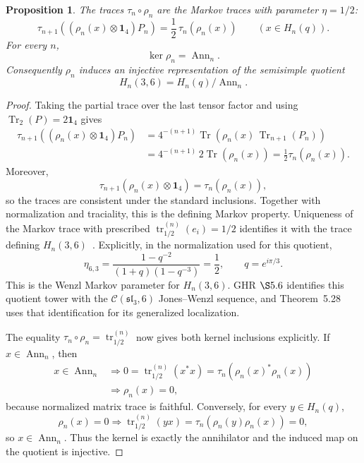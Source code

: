 \documentclass[11pt]{article}
\newtheorem{proposition}[theorem]{Proposition}
\theoremstyle{remark}
\newcommand{\Id}{\mathbf 1}
\newcommand{\Tr}{\operatorname{Tr}}
\newcommand{\cC}{\mathcal C}
\begin{document}
\begin{proposition}\label{prop:markov}
The traces \(\tau_n\circ\rho_n\) are the Markov traces with parameter
\(\eta=1/2\):
\begin{equation}
  \tau_{n+1}\!\left((\rho_n(x)\otimes\Id_4)P_n\right)
  =\frac12\,\tau_n(\rho_n(x))
  \qquad(x\in H_n(q)).
  \label{eq:markov}
\end{equation}
For every \(n\),
\[
  \ker\rho_n=\operatorname{Ann}_n.
\]
Consequently \(\rho_n\)
induces an injective representation of the semisimple quotient
\[
  H_n(3,6)=H_n(q)/\operatorname{Ann}_n.
\]
\end{proposition}

\begin{proof}
Taking the partial trace over the last tensor factor and using
\(\Tr_2(P)=2\Id_4\) gives
\[
\begin{aligned}
  \tau_{n+1}\!\left((\rho_n(x)\otimes\Id_4)P_n\right)
  &=
  4^{-(n+1)}
  \Tr\!\left(\rho_n(x)\,\Tr_{n+1}(P_n)\right)\\
  &=
  4^{-(n+1)}\,2\Tr(\rho_n(x))
   =\frac12\tau_n(\rho_n(x)).
\end{aligned}
\]
Moreover,
\[
  \tau_{n+1}(\rho_n(x)\otimes\Id_4)=\tau_n(\rho_n(x)),
\]
so the traces are consistent under the standard inclusions.
Together with normalization and traciality, this is the defining Markov
property.  Uniqueness of the Markov trace with prescribed
\(\operatorname{tr}^{(n)}_{1/2}(e_i)=1/2\) identifies it with the trace defining
\(H_n(3,6)\)~\cite[Eq.~(3.2)]{Wenzl1988}.  Explicitly, in the normalization
used for this quotient,
\[
  \eta_{6,3}
  =\frac{1-q^{-2}}{(1+q)(1-q^{-3})}
  =\frac12,
  \qquad q=e^{i\pi/3}.
\]
This is the Wenzl Markov parameter for \(H_n(3,6)\).  GHR \(\S5.6\) identifies
this quotient tower with the \(\cC(\mathfrak{sl}_3,6)\) Jones--Wenzl sequence,
and Theorem~5.28 uses that identification for its generalized localization.

The equality \(\tau_n\circ\rho_n=\operatorname{tr}^{(n)}_{1/2}\) now gives
both kernel inclusions explicitly.  If \(x\in\operatorname{Ann}_n\), then
\[
\begin{aligned}
  x\in\operatorname{Ann}_n
  &\Longrightarrow
  0=\operatorname{tr}^{(n)}_{1/2}(x^*x)
   =\tau_n\!\left(\rho_n(x)^*\rho_n(x)\right)\\
  &\Longrightarrow \rho_n(x)=0,
\end{aligned}
\]
because normalized matrix trace is faithful.  Conversely, for every
\(y\in H_n(q)\),
\[
  \rho_n(x)=0
  \Longrightarrow
  \operatorname{tr}^{(n)}_{1/2}(yx)
  =\tau_n\!\left(\rho_n(y)\rho_n(x)\right)=0,
\]
so \(x\in\operatorname{Ann}_n\).  Thus the kernel is exactly the annihilator
and the induced map on the quotient is injective.
\end{proof}
\end{document}
